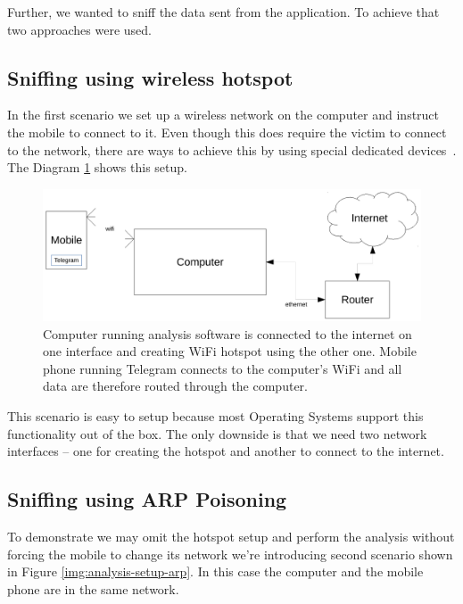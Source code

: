 \documentclass[thesis=M,english]{FITthesis}[2012/10/20]
\begin{document}
Further, we wanted to sniff the data sent from the application. To achieve that two approaches were used.

\subsection{Sniffing using wireless hotspot}

In the first scenario we set up a wireless network on the computer and instruct the mobile to connect to it. Even though this does require the victim to connect to the network, there are ways to achieve this by using special dedicated devices~\cite{pineapple}. The Diagram \ref{img:analysis-setup-hotspot} shows this setup.

\begin{figure}[htb]
	\centering
	\includegraphics[width=1\textwidth]{setup-hotspot.pdf}
	\caption[Analysis setup 1]{Computer running analysis software is connected to the internet on one interface and creating WiFi hotspot using the other one. Mobile phone running Telegram connects to the computer's WiFi and all data are therefore routed through the computer.}
	\label{img:analysis-setup-hotspot}
\end{figure}

This scenario is easy to setup because most Operating Systems support this functionality out of the box. The only downside is that we need two network interfaces -- one for creating the hotspot and another to connect to the internet.


\subsection{Sniffing using ARP Poisoning}

To demonstrate we may omit the hotspot setup and perform the analysis without forcing the mobile to change its network we're introducing second scenario shown in Figure \ref{img:analysis-setup-arp}. In this case the computer and the mobile phone are in the same network.
\end{document}
